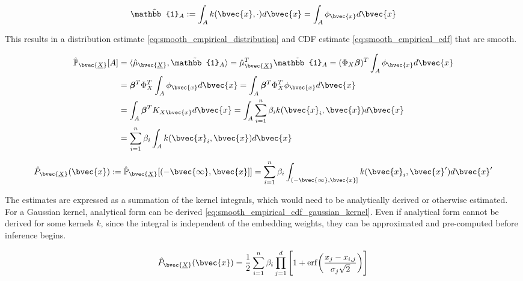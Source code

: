 \documentclass[twoside]{article} \usepackage{aistats2017}
\newcommand{\rv}[1]{\underline{#1}}
\newcommand{\ds}[1]{{#1}}
\begin{document}
		\begin{equation}
			\tilde{\mathbb{1}}_{A} := \int_{A} k(\bvec{x}, \cdot) d\bvec{x} = \int_{A} \phi_{\bvec{x}} d\bvec{x}
		\label{eq:indicator_smooth}
		\end{equation}
		
		This results in a distribution estimate \eqref{eq:smooth_empirical_distribution} and CDF estimate \eqref{eq:smooth_empirical_cdf} that are smooth.

		\begin{equation}
		\begin{aligned}
			\hat{\mathbb{P}}_{\bvec{\rv{X}}}[A] &= \langle \hat{\mu}_{\bvec{\rv{X}}}, \tilde{\mathbb{1}}_{A} \rangle = \hat{\mu}_{\bvec{\rv{X}}}^{T} \tilde{\mathbb{1}}_{A} = (\Phi_{\ds{X}} \bm{\beta})^{T} \int_{A} \phi_{\bvec{x}} d\bvec{x} \\
			&= \bm{\beta}^{T} \Phi_{\ds{X}}^{T} \int_{A} \phi_{\bvec{x}} d\bvec{x} = \int_{A} \bm{\beta}^{T} \Phi_{\ds{X}}^{T} \phi_{\bvec{x}} d\bvec{x} \\
			&= \int_{A} \bm{\beta}^{T} K_{\ds{X} \bvec{x}} d\bvec{x} = \int_{A} \sum_{i = 1}^{n} \beta_{i} k(\bvec{x}_{i}, \bvec{x}) d\bvec{x} \\
			&= \sum_{i = 1}^{n} \beta_{i} \int_{A}  k(\bvec{x}_{i}, \bvec{x}) d\bvec{x} \\
		\end{aligned}
		\label{eq:smooth_empirical_distribution}
		\end{equation}	
		
		\begin{equation}
		\hat{P}_{\bvec{\rv{X}}}(\bvec{x}) := \hat{\mathbb{P}}_{\bvec{\rv{X}}}[(-\bvec{\infty}, \bvec{x}]] = \sum_{i = 1}^{n} \beta_{i} \int_{(-\bvec{\infty}, \bvec{x}]}  k(\bvec{x}_{i}, \bvec{x}') d\bvec{x}'
		\label{eq:smooth_empirical_cdf}
		\end{equation}
		
		The estimates are expressed as a summation of the kernel integrals, which would need to be analytically derived or otherwise estimated. For a Gaussian kernel, analytical form can be derived \eqref{eq:smooth_empirical_cdf_gaussian_kernel}. Even if analytical form cannot be derived for some kernels $k$, since the integral is independent of the embedding weights, they can be approximated and pre-computed before inference begins.

		\begin{equation}
			\hat{P}_{\bvec{\rv{X}}}(\bvec{x}) = \frac{1}{2} \sum_{i = 1}^{n} \beta_{i} \prod_{j = 1}^{d} \Bigg[1 + \mathrm{erf}\bigg(\frac{x_{j} - x_{i, j}}{\sigma_{j} \sqrt{2}}\bigg)\Bigg]
		\label{eq:smooth_empirical_cdf_gaussian_kernel}
		\end{equation}
		
\end{document}
